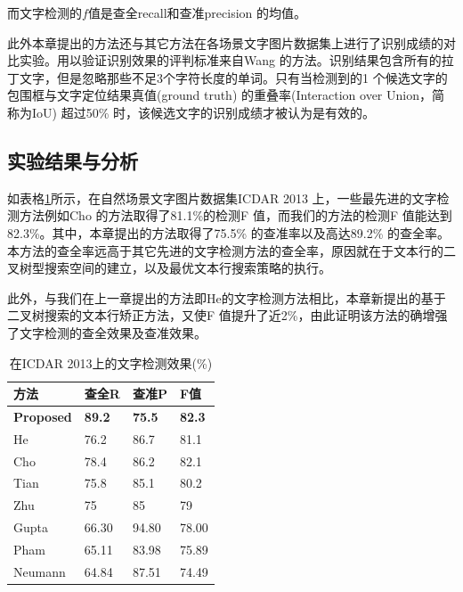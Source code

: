         而文字检测的$f$值是查全recall和查准precision 的均值。

        此外本章提出的方法还与其它方法在各场景文字图片数据集上进行了识别成绩的对比实验。用以验证识别效果的评判标准来自Wang\cite{Wang2012End} 的方法。识别结果包含所有的拉丁文字，但是忽略那些不足3个字符长度的单词。只有当检测到的1 个候选文字的包围框与文字定位结果真值(ground truth) 的重叠率(Interaction over Union，简称为IoU) 超过50\% 时，该候选文字的识别成绩才被认为是有效的。

        \subsection{实验结果与分析}

        如表格\ref{tab.c4_icdar13}所示，在自然场景文字图片数据集ICDAR 2013 上，一些最先进的文字检测方法例如Cho\cite{Cho2016Canny} 的方法取得了81.1\%的检测F 值，而我们的方法的检测F 值能达到82.3\%。其中，本章提出的方法取得了75.5\% 的查准率以及高达89.2\% 的查全率。本方法的查全率远高于其它先进的文字检测方法的查全率，原因就在于文本行的二叉树型搜索空间的建立，以及最优文本行搜索策略的执行。


        此外，与我们在上一章提出的方法即He\cite{He2017scene}的文字检测方法相比，本章新提出的基于二叉树搜索的文本行矫正方法，又使F 值提升了近2\%，由此证明该方法的确增强了文字检测的查全效果及查准效果。

        \begin{table}[!h]
        \centering
        \caption{在ICDAR 2013上的文字检测效果(\%)}
        \begin{tabular}{p{}p{} p{} p{}}
        \toprule
        方法 & 查全R & 查准P & F值 \\
        \midrule
        \textbf{Proposed} & \textbf{89.2} & \textbf{75.5} & \textbf{82.3}\\
        He\cite{He2017scene} & 76.2 & 86.7 & 81.1 \\
        Cho\cite{Cho2016Canny} & 78.4 & 86.2 & 82.1 \\
        Tian\cite{Tian2016Text} & 75.8 & 85.1 & 80.2 \\
        Zhu\cite{Zhu2016Text} & 75 & 85 & 79 \\
        Gupta\cite{Gupta2016Synthetic} & 66.30 & 94.80 & 78.00 \\
        Pham\cite{Pham2016Robust} & 65.11 & 83.98 & 75.89 \\
        Neumann\cite{Neumann2012Real} & 64.84 & 87.51 & 74.49 \\
        \bottomrule
        \end{tabular}
        \label{tab.c4_icdar13}
        \end{table}

